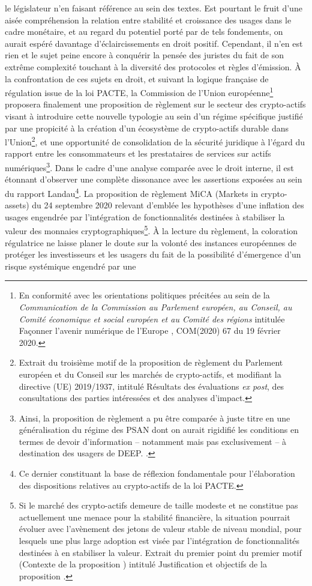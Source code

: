 {le législateur n'en faisant référence au sein des textes. Est pourtant le fruit d'une aisée compréhension la relation entre stabilité et croissance des usages dans le cadre monétaire, et au regard du potentiel porté par de tels fondements, on aurait espéré davantage d'éclaircissements en droit positif. Cependant, il n'en est rien et le sujet peine encore à conquérir la pensée des juristes du fait de son extrême complexité touchant à la diversité des protocoles et règles d'émission. À la confrontation de ces sujets en droit, et suivant la logique française de régulation issue de la loi \acrshort{PACTE}, la Commission de l'Union européenne\footnote{En conformité avec les orientations politiques précitées au sein de la \emph{Communication de la Commission au Parlement européen, au Conseil, au Comité économique et social européen et au Comité des régions} intitulée \og Façonner l'avenir numérique de l'Europe \fg{}, COM(2020) 67 du 19 février 2020.} proposera finalement une proposition de règlement sur le secteur des crypto-actifs visant à introduire cette nouvelle typologie au sein d'un régime spécifique justifié par une propicité à \og la création d'un écosystème de crypto-actifs durable dans l'Union\fg{}\footnote{Extrait du troisième motif de la proposition de règlement du Parlement européen et du Conseil sur les marchés de crypto-actifs, et modifiant la directive (UE) 2019/1937, intitulé \og Résultats des évaluations \emph{ex post}, des consultations des parties intéressées et des analyses d'impact\fg{}.}, et une opportunité de consolidation de la sécurité juridique à l'égard du rapport entre les consommateurs et les prestataires de services sur actifs numériques\footnote{Ainsi, la proposition de règlement a pu être comparée à juste titre en une généralisation du régime des PSAN dont on aurait rigidifié les conditions en termes de devoir d'information \---{} notamment mais pas exclusivement \---{} à destination des usagers de DEEP. .}. Dans le cadre d'une analyse comparée avec le droit interne, il est étonnant d'observer une complète dissonance avec les assertions exposées au sein du rapport Landau\footnote{Ce dernier constituant la base de réflexion fondamentale pour l'élaboration des dispositions relatives au crypto-actifs de la loi PACTE.}. La proposition de règlement \acrshort{MiCA} (Markets in crypto-assets) du 24 septembre 2020 relevant d'emblée les hypothèses d'une inflation des usages engendrée par l'intégration de fonctionnalités destinées à stabiliser la valeur des monnaies cryptographiques\footnote{\og Si le marché des crypto-actifs demeure de taille modeste et ne constitue pas actuellement une menace pour la stabilité financière, la situation pourrait évoluer avec l'avènement des \og jetons de valeur stable de niveau mondial\fg{}, pour lesquels une plus large adoption est visée par l'intégration de fonctionnalités destinées à en stabiliser la valeur\fg{}. Extrait du premier point du premier motif (\og Contexte de la proposition \fg{}) intitulé \og Justification et objectifs de la proposition \fg{}.}. À la lecture du règlement, la coloration régulatrice ne laisse planer le doute sur la volonté des instances européennes de protéger les investisseurs et les usagers du fait de la possibilité d'émergence d'un risque systémique engendré par une }
